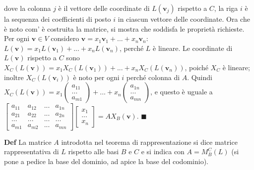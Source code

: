 \documentclass{article}
\begin{document}
dove la colonna $j$ \`{e} il vettore delle coordinate di $L\left( \mathbf{v}%
_{j}\right) $ rispetto a $C$, la riga $i$ \`{e} la sequenza dei coefficienti
di posto $i$ in ciascun vettore delle coordinate. Ora che \`{e} noto com'%
\`{e} costruita la matrice, si mostra che soddisfa le propriet\`{a}
richieste. Per ogni $\mathbf{v}\in V$ considero $\mathbf{v}=x_{1}\mathbf{v}%
_{1}+...+x_{n}\mathbf{v}_{n}$: $L\left( \mathbf{v}\right) =x_{1}L\left( 
\mathbf{v}_{1}\right) +...+x_{n}L\left( \mathbf{v}_{n}\right) $, perch\'{e} $%
L$ \`{e} lineare. Le coordinate di $L\left( \mathbf{v}\right) $ rispetto a $%
C $ sono $X_{C}\left( L\left( \mathbf{v}\right) \right) =x_{1}X_{C}\left(
L\left( \mathbf{v}_{1}\right) \right) +...+x_{n}X_{C}\left( L\left( \mathbf{v%
}_{n}\right) \right) $, poich\'{e} $X_{C}$ \`{e} lineare; inoltre $%
X_{C}\left( L\left( \mathbf{v}_{i}\right) \right) $ \`{e} noto per ogni $i$
perch\'{e} colonna di $A$. Quindi $X_{C}\left( L\left( \mathbf{v}\right)
\right) =x_{1}\left( 
\begin{array}{c}
a_{11} \\ 
... \\ 
a_{m1}%
\end{array}%
\right) +...+x_{n}\left( 
\begin{array}{c}
a_{1n} \\ 
... \\ 
a_{mn}%
\end{array}%
\right) $, e questo \`{e} uguale a $\left[ 
\begin{array}{cccc}
a_{11} & a_{12} & ... & a_{1n} \\ 
a_{21} & a_{22} & ... & a_{2n} \\ 
... & ... & ... & ... \\ 
a_{m1} & a_{m2} & ... & a_{mn}%
\end{array}%
\right] \left[ 
\begin{array}{c}
x_{1} \\ 
... \\ 
x_{n}%
\end{array}%
\right] =AX_{B}\left( \mathbf{v}\right) $. $%
\blacksquare $

\textbf{Def} La matrice $A$ introdotta nel teorema di rappresentazione si
dice matrice rappresentativa di $L$ rispetto alle basi $B$ e $C$ e si indica
con $A=M_{B}^{C}\left( L\right) $ (si pone a pedice la base del dominio, ad
apice la base del codominio).
\end{document}
